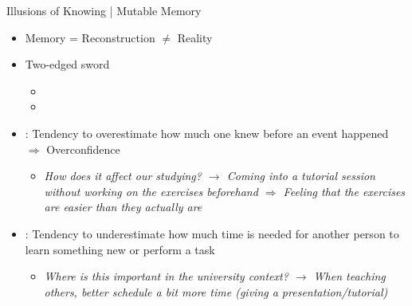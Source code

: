 \documentclass{ercisbeamer}
\begin{document}
\begin{frame}{Illusions of Knowing | Mutable Memory}
    \pause
    \begin{tbox}
        \begin{itemize}
            \item Memory = Reconstruction $\ne$ Reality
            \item Two-edged sword
            \begin{itemize}
                \item {} 
                \item {}
            \end{itemize}
            \item {}: Tendency to overestimate how much one knew before an event happened $\Rightarrow$ Overconfidence
            \begin{itemize}
                \item \emph{How does it affect our studying? \pause $\rightarrow$ Coming into a tutorial session without working on the exercises beforehand $\Rightarrow$ Feeling that the exercises are easier than they actually are}
            \end{itemize}
            \item {}: Tendency to underestimate how much time is needed for another person to learn something new or perform a task
            \begin{itemize}
                \item \emph{Where is this important in the university context? \pause $\rightarrow$ When teaching others, better schedule a bit more time (giving a presentation/tutorial)}
            \end{itemize}
        \end{itemize}     
    \end{tbox}
\end{frame}
\setbgimage{}
\end{document}
